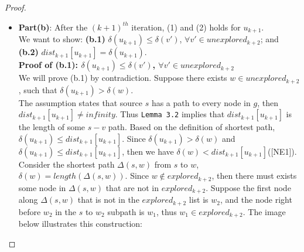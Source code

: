 \begin{proof}
\begin{itemize}
\[\begin{cases}
          dist_j[q] & otherwise 
        \end{cases}
        \right\}
      \]
  \\
  Since $dist_{i+1}[q] = \delta(q) \leq length(p)$ for all path $p$ from $s$ to $q$, then for each proceeding $j^{th}$ iteration after the $i^{th}$ iteration, there does not exists such $q''$ such that $dist_j[q''] + weight(q'', q) < \delta(q) = dist_{i+1}[q]$. Hence $dist_{j+1}[q] = \delta(q) = dist_{i+1}[q], \forall j > i$. Since $k+1 > i$, then for all $q \in S$, $dist_{k+1} = \delta(q) = dist_{i+1}[q]$. (2) holds for $explored_{k+1}$. 
  \\\\
  Hence we have proved that both (1) and (2) holds for all nodes in $explored_{k+1}$.




  \item \textbf{\large{Part(b)}}: After the $(k+1)^{th}$ iteration, (1) and (2) holds for $u_{k+1}$. 
  \\
  We want to show: \textbf{(b.1)} $\delta(u_{k+1}) \leq \delta(v')$, $\forall v' \in unexplored_{k+2}$; and \textbf{(b.2)} $dist_{k+1}[u_{k+1}] = \delta(u_{k+1})$. 
  \\
  \textbf{Proof of (b.1): $\delta(u_{k+1}) \leq \delta(v')$, $\forall v' \in unexplored_{k+2}$}
  \\
  We will prove (b.1) by contradiction. Suppose there exists $w \in unexplored_{k+2}$, such that $\delta(u_{k+1}) > \delta(w)$. 
  \\
  The assumption states that source $s$ has a path to every node in $g$, then $dist_{k+1}[u_{k+1}] \neq infinity$. Thus \texttt{Lemma 3.2} implies that $dist_{k+1}[u_{k+1}]$ is the length of some $s-v$ path. Based on the definition of shortest path, $\delta(u_{k+1}) \leq dist_{k+1}[u_{k+1}]$. Since $\delta(u_{k+1}) > \delta(w)$ and $\delta(u_{k+1}) \leq dist_{k+1}[u_{k+1}]$, then we have $\delta(w) < dist_{k+1}[u_{k+1}]$([NE1]). 
  \\
  Consider the shortest path $\Delta(s, w)$ from $s$ to $w$, $\delta(w) = length(\Delta(s, w))$. Since $w \notin explored_{k+2}$, then there must exists some node in $\Delta(s, w)$ that are not in $explored_{k+2}$. Suppose the first node along $\Delta(s, w)$ that is not in the $explored_{k+2}$ list is $w_2$, and the node right before $w_2$ in the $s$ to $w_2$ subpath is $w_1$, thus $w_1 \in explored_{k+2}$. The image below illustrates this construction: 

\end{itemize}
\end{proof}
